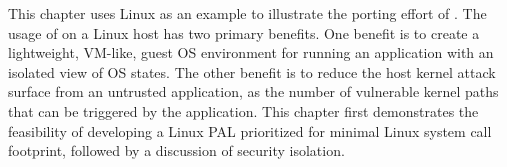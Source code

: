 This chapter uses Linux as an example
to illustrate the porting effort of \thehostabi{}.
The usage of \graphene{} on a Linux host
has two primary benefits.
One benefit is to create a lightweight, VM-like, guest OS environment for running an application
with an isolated view of OS states.
The other benefit is
to reduce the host kernel attack surface from an untrusted application,
as the number of vulnerable kernel paths that can be triggered by the application.
This chapter first demonstrates the feasibility of developing a Linux PAL prioritized for minimal Linux system call footprint,
followed by a discussion of security isolation.


